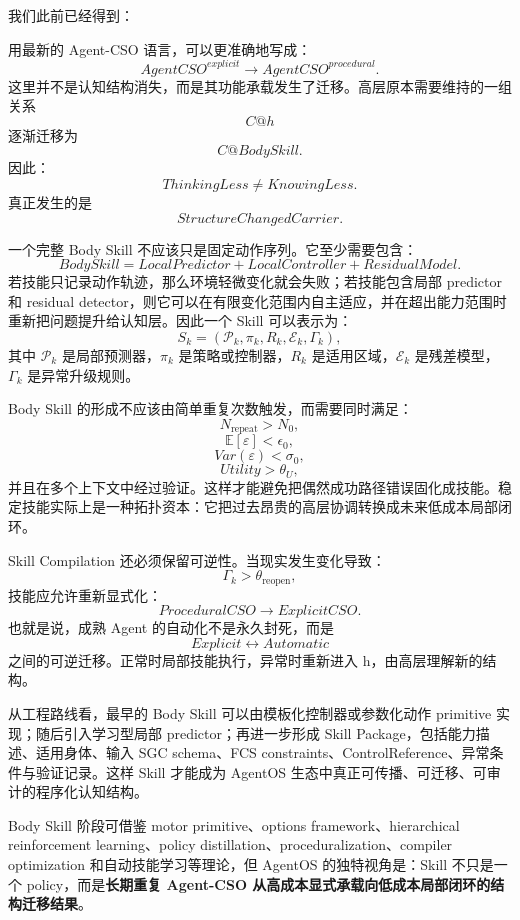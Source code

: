 我们此前已经得到：
\begin{statementbox}
\centering
{}
\end{statementbox}
用最新的 Agent-CSO 语言，可以更准确地写成：
\[
AgentCSO^{explicit}
\rightarrow
AgentCSO^{procedural}.
\]
这里并不是认知结构消失，而是其功能承载发生了迁移。高层原本需要维持的一组关系
\[
C@h
\]
逐渐迁移为
\[
C@BodySkill.
\]
因此：
\[
\boxed{
ThinkingLess\neq KnowingLess.
}
\]
真正发生的是
\[
StructureChangedCarrier.
\]

一个完整 Body Skill 不应该只是固定动作序列。它至少需要包含：
\[
\boxed{
BodySkill=
LocalPredictor+
LocalController+
ResidualModel.
}
\]
若技能只记录动作轨迹，那么环境轻微变化就会失败；若技能包含局部 predictor 和 residual detector，则它可以在有限变化范围内自主适应，并在超出能力范围时重新把问题提升给认知层。因此一个 Skill 可以表示为：
\[
S_k=
\left(
\mathcal P_k,
\pi_k,
R_k,
\mathcal E_k,
\Gamma_k
\right),
\]
其中 $\mathcal P_k$ 是局部预测器，$\pi_k$ 是策略或控制器，$R_k$ 是适用区域，$\mathcal E_k$ 是残差模型，$\Gamma_k$ 是异常升级规则。

Body Skill 的形成不应该由简单重复次数触发，而需要同时满足：
\[
N_{\mathrm{repeat}}>N_0,
\]
\[
\mathbb E[\varepsilon]<\epsilon_0,
\]
\[
Var(\varepsilon)<\sigma_0,
\]
\[
Utility>\theta_U,
\]
并且在多个上下文中经过验证。这样才能避免把偶然成功路径错误固化成技能。稳定技能实际上是一种拓扑资本：它把过去昂贵的高层协调转换成未来低成本局部闭环。

Skill Compilation 还必须保留可逆性。当现实发生变化导致：
\[
\Gamma_k>\theta_{\mathrm{reopen}},
\]
技能应允许重新显式化：
\[
ProceduralCSO
\rightarrow
ExplicitCSO.
\]
也就是说，成熟 Agent 的自动化不是永久封死，而是
\[
Explicit
\leftrightarrow
Automatic
\]
之间的可逆迁移。正常时局部技能执行，异常时重新进入 h，由高层理解新的结构。

从工程路线看，最早的 Body Skill 可以由模板化控制器或参数化动作 primitive 实现；随后引入学习型局部 predictor；再进一步形成 Skill Package，包括能力描述、适用身体、输入 SGC schema、FCS constraints、ControlReference、异常条件与验证记录。这样 Skill 才能成为 AgentOS 生态中真正可传播、可迁移、可审计的程序化认知结构。

Body Skill 阶段可借鉴 motor primitive、options framework、hierarchical reinforcement learning、policy distillation、proceduralization、compiler optimization 和自动技能学习等理论，但 AgentOS 的独特视角是：Skill 不只是一个 policy，而是\textbf{长期重复 Agent-CSO 从高成本显式承载向低成本局部闭环的结构迁移结果}。

